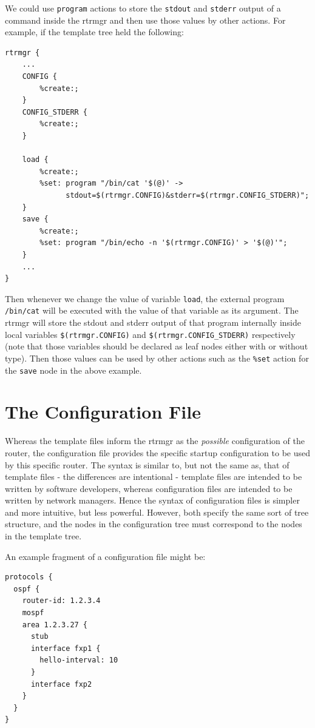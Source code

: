 \documentclass[11pt]{article}
\begin{document}
We could use {\tt program} actions to store the {\tt stdout} and {\tt stderr}
output of a command inside the rtrmgr and then use those values by other
actions.
For example, if the template tree held the following:

\begin{verbatim}
rtrmgr {
    ...
    CONFIG {
        %create:;
    }
    CONFIG_STDERR {
        %create:;
    }

    load {
        %create:;
        %set: program "/bin/cat '$(@)' ->
              stdout=$(rtrmgr.CONFIG)&stderr=$(rtrmgr.CONFIG_STDERR)";
    }
    save {
        %create:;
        %set: program "/bin/echo -n '$(rtrmgr.CONFIG)' > '$(@)'";
    }
    ...
}
\end{verbatim}

Then whenever we change the value of variable {\tt load}, the external
program {\tt /bin/cat} will be executed with the value of that variable as
its argument. The rtrmgr will store the stdout and stderr output of
that program internally inside local variables {\tt \$(rtrmgr.CONFIG)}
and {\tt \$(rtrmgr.CONFIG\_STDERR)} respectively (note that those variables
should be declared as leaf nodes either with or without type).
Then those values can be used by other actions such as the {\tt \%set}
action for the {\tt save} node in the above example.

\newpage

\section{The Configuration File}

Whereas the template files inform the rtrmgr as the {\it possible}
configuration of the router, the configuration file provides the
specific startup configuration to be used by this specific router.
The syntax is similar to, but not the same as, that of template files -
the differences are intentional - template files are intended to be
written by software developers, whereas configuration files are
intended to be written by network managers.  Hence the syntax of
configuration files is simpler and more intuitive, but less powerful.
However, both specify the same sort of tree structure, and the nodes
in the configuration tree must correspond to the nodes in the template
tree.

An example fragment of a configuration file might be:

\begin{verbatim}
protocols {
  ospf {
    router-id: 1.2.3.4
    mospf
    area 1.2.3.27 {
      stub
      interface fxp1 {
        hello-interval: 10
      }
      interface fxp2
    }
  }
}
\end{verbatim}
\end{document}

